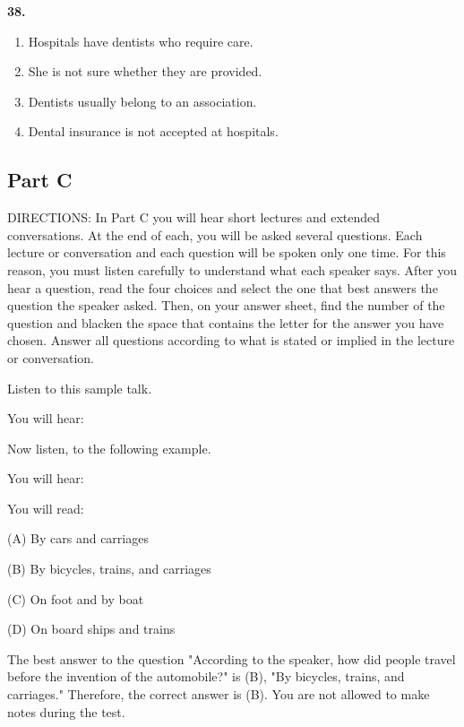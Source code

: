\documentclass[12pt]{article}
\begin{document}
\par
\vspace{0.25\baselineskip}
\noindent\textbf{38.}
\begin{enumerate}[label=(\Alph*),leftmargin=*,itemsep=0.2em]
\item Hospitals have dentists who require care.
\item She is not sure whether they are provided.
\item Dentists usually belong to an association.
\item Dental insurance is not accepted at hospitals.
\end{enumerate}
\par
\vspace{0.25\baselineskip}
\subsection*{Part C}
DIRECTIONS: In Part C you will hear short lectures and extended conversations. At the end of each, you will be asked several questions. Each lecture or conversation and each question will be spoken only one time. For this reason, you must listen carefully to understand what each speaker says. After you hear a question, read the four choices and select the one that best answers the question the speaker asked. Then, on your answer sheet, find the number of the question and blacken the space that contains the letter for the answer you have chosen. Answer all questions according to what is stated or implied in the lecture or conversation.\par
\begin{exampleblock}
Listen to this sample talk.\par
You will hear:\par
Now listen, to the following example.\par
You will hear:\par
You will read:\par
(A) By cars and carriages\par
(B) By bicycles, trains, and carriages\par
(C) On foot and by boat\par
(D) On board ships and trains\par
The best answer to the question "According to the speaker, how did people travel before the invention of the automobile?" is (B), "By bicycles, trains, and carriages." Therefore, the correct answer is (B). You are not allowed to make notes during the test.\par
\end{exampleblock}
\end{document}
